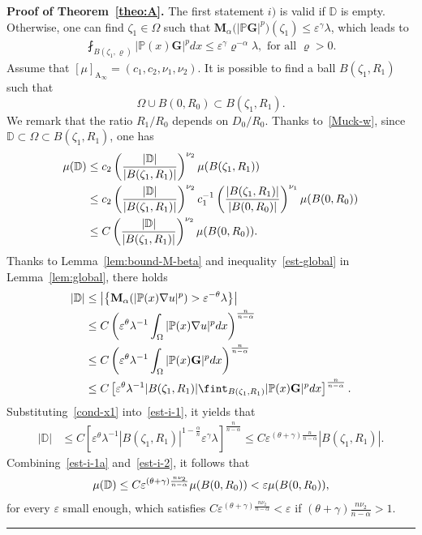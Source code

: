\documentclass[a4paper, 11pt]{article}
\newenvironment{proof}[1][Proof]{\textbf{#1.} }{\hfill\rule{0.5em}{0.5em}}
\begin{document}
\begin{proof}[Proof of Theorem~\ref{theo:A}]
The first statement $i)$ is valid if $\mathbb{D}$ is empty. Otherwise, one can find $\zeta_1 \in \Omega$ such that $\mathbf{M}_{\alpha}\big(|\mathbb{P} \mathbf{G}|^{p}\big)(\zeta_1) \le \varepsilon^{\gamma} \lambda$, which leads to
\begin{align}\label{cond-x1}
\fint_{B(\zeta_1,\varrho)} |\mathbb{P}(x) \mathbf{G}|^{p} dx \le \varepsilon^{\gamma} \varrho^{-\alpha} \lambda, \mbox{ for all } \varrho>0.
\end{align}
Assume that $[\mu]_{\mathrm{A}_\infty} = (c_1,c_2,\nu_1,\nu_2)$. It is possible to find a ball $B(\zeta_1, R_1)$ such that
$$\Omega \cup B(0,R_0) \subset B(\zeta_1, R_1).$$
We remark that the ratio $R_1/R_0$ depends on $D_0/R_0$. Thanks to~\eqref{Muck-w}, since $\mathbb{D} \subset \Omega \subset B(\zeta_1, R_1)$,  one has
\begin{align}
\mu(\mathbb{D}) &\le c_2\left(\frac{|\mathbb{D}|}{|B(\zeta_1, R_1)|}\right)^{\nu_2}\mu(B(\zeta_1, R_1)) \notag \\
&\le c_2\left(\frac{|\mathbb{D}|}{|B(\zeta_1, R_1)|}\right)^{\nu_2}c_1^{-1}\left(\frac{|B(\zeta_1, R_1)|}{|B(0,R_0)|}\right)^{\nu_1}\mu(B(0,R_0)) \notag \\
& \le C\left(\frac{|\mathbb{D}|}{|B(\zeta_1, R_1)|}\right)^{\nu_2} \mu(B(0,R_0)).\label{est-i-1a}
\end{align}
Thanks to Lemma~\ref{lem:bound-M-beta} and inequality~\eqref{est-global} in Lemma~\ref{lem:global}, there holds
\begin{align}
|\mathbb{D}| & \le \left|\left\{\mathbf{M}_{\alpha}(|\mathbb{P}(x)\nabla u|^{p}) > \varepsilon^{-\theta} \lambda\right\}\right| \notag \\
& \le C\left(\varepsilon^{\theta} \lambda^{-1}\int_{\Omega} |\mathbb{P}(x)\nabla u|^{p}  dx\right)^{\frac{n}{n-\alpha}} \notag \\
& \le C\left(\varepsilon^{\theta} \lambda^{-1}\int_{\Omega} |\mathbb{P}(x) \mathbf{G}|^{p}  dx\right)^{\frac{n}{n-\alpha}} \notag \\
& \le C\left[\varepsilon^{\theta} \lambda^{-1} |B(\zeta_1, R_1)| \fint_{B(\zeta_1, R_1)} |\mathbb{P}(x) \mathbf{G}|^{p}  dx\right]^{\frac{n}{n-\alpha}}. \label{est-i-1}
\end{align}
Substituting~\eqref{cond-x1} into~\eqref{est-i-1}, it yields that
\begin{align}
|\mathbb{D}| & \le C\left[\varepsilon^{\theta} \lambda^{-1} |B(\zeta_1, R_1)|^{1-\frac{\alpha}{n}}  \varepsilon^{\gamma} \lambda \right]^{\frac{n}{n-\alpha}} \le C \varepsilon^{(\theta+\gamma)\frac{n}{n-\alpha}} |B(\zeta_1, R_1)|. \label{est-i-2}
\end{align}
Combining~\eqref{est-i-1a} and~\eqref{est-i-2}, it follows that
\begin{align}
\mu(\mathbb{D}) \le C \varepsilon^{(\theta+\gamma)\frac{n\nu_2}{n-\alpha}} \mu(B(0,R_0)) < \varepsilon \mu(B(0,R_0)),\notag
\end{align}
for every $\varepsilon$ small enough, which satisfies  $C \varepsilon^{(\theta+\gamma)\frac{n\nu_2}{n-\alpha}} < \varepsilon$ if $(\theta+\gamma)\frac{n\nu_2}{n-\alpha}>1$.\\


\end{proof}
\end{document}
